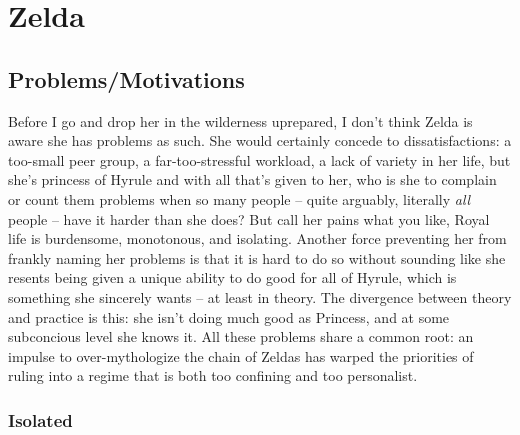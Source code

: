 \section{Zelda}
  \subsection{Problems/Motivations}
  Before I go and drop her in the wilderness uprepared, I don't think Zelda is aware she has problems as such. She would certainly concede to dissatisfactions: a too-small peer group, a far-too-stressful workload, a lack of variety in her life, but she's princess of Hyrule and with all that's given to her, who is she to complain or count them problems when so many people -- quite arguably, literally \emph{all} people -- have it harder than she does?  But call her pains what you like, Royal life is burdensome, monotonous, and isolating. Another force preventing her from frankly naming her problems is that it is hard to do so without sounding like she resents being given a unique ability to do good for all of Hyrule, which is something she sincerely wants -- at least in theory. The divergence between theory and practice is this: she isn't doing much good as Princess, and at some subconcious level she knows it. All these problems share a common root: an impulse to over-mythologize the chain of Zeldas has warped the priorities of ruling into a regime that is both too confining and too personalist. 

  \subsubsection{Isolated}

